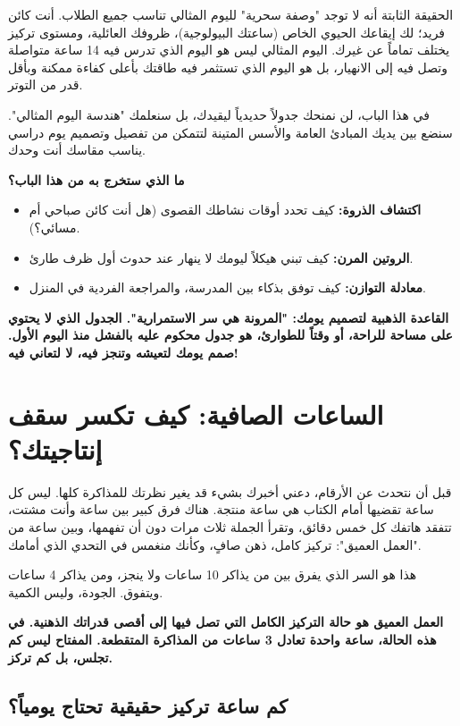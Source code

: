 \documentclass[12pt,a4paper]{book}
\newcommand{\importantAr}[1]{%
	\begin{important}
		\bfseries #1
	\end{important}
}
\begin{document}
	الحقيقة الثابتة أنه لا توجد "وصفة سحرية" لليوم المثالي تناسب جميع الطلاب. أنت كائن فريد؛ لك إيقاعك الحيوي الخاص (ساعتك البيولوجية)، ظروفك العائلية، ومستوى تركيز يختلف تماماً عن غيرك. اليوم المثالي ليس هو اليوم الذي تدرس فيه 14 ساعة متواصلة وتصل فيه إلى الانهيار، بل هو اليوم الذي تستثمر فيه طاقتك بأعلى كفاءة ممكنة وبأقل قدر من التوتر.
	
	في هذا الباب، لن نمنحك جدولاً حديدياً ليقيدك، بل سنعلمك "هندسة اليوم المثالي". سنضع بين يديك المبادئ العامة والأسس المتينة لتتمكن من تفصيل وتصميم يوم دراسي يناسب مقاسك أنت وحدك.
	
	\textbf{ما الذي ستخرج به من هذا الباب؟}
	\begin{itemize}
		\item \textbf{اكتشاف الذروة:} كيف تحدد أوقات نشاطك القصوى (هل أنت كائن صباحي أم مسائي؟).
		\item \textbf{الروتين المرن:} كيف تبني هيكلاً ليومك لا ينهار عند حدوث أول ظرف طارئ.
		\item \textbf{معادلة التوازن:} كيف توفق بذكاء بين المدرسة، والمراجعة الفردية في المنزل.
	\end{itemize}
	
	\importantAr{القاعدة الذهبية لتصميم يومك: "المرونة هي سر الاستمرارية". الجدول الذي لا يحتوي على مساحة للراحة، أو وقتاً للطوارئ، هو جدول محكوم عليه بالفشل منذ اليوم الأول. صمم يومك لتعيشه وتنجز فيه، لا لتعاني فيه!}
	
	
	\section{الساعات الصافية: كيف تكسر سقف إنتاجيتك؟}
	\label{sec:owner-experiences7}
	
	قبل أن نتحدث عن الأرقام، دعني أخبرك بشيء قد يغير نظرتك للمذاكرة كلها. ليس كل ساعة تقضيها أمام الكتاب هي ساعة منتجة. هناك فرق كبير بين ساعة وأنت مشتت، تتفقد هاتفك كل خمس دقائق، وتقرأ الجملة ثلاث مرات دون أن تفهمها، وبين ساعة من "العمل العميق": تركيز كامل، ذهن صافٍ، وكأنك منغمس في التحدي الذي أمامك.
	
	هذا هو السر الذي يفرق بين من يذاكر 10 ساعات ولا ينجز، ومن يذاكر 4 ساعات ويتفوق. الجودة، وليس الكمية.
	
	\importantAr{العمل العميق هو حالة التركيز الكامل التي تصل فيها إلى أقصى قدراتك الذهنية. في هذه الحالة، ساعة واحدة تعادل 3 ساعات من المذاكرة المتقطعة. المفتاح ليس كم تجلس، بل كم تركز.}
	
	\subsection{كم ساعة تركيز حقيقية تحتاج يومياً؟}
	
\end{document}
